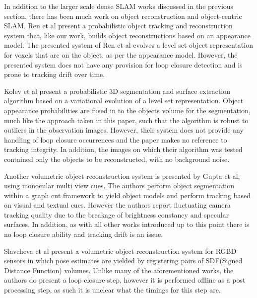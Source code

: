 In addition to the larger scale dense SLAM works discussed in the previous section, there has been much work on object reconstruction and 
object-centric SLAM. Ren et al present a probabilistic object tracking and reconstruction system\cite{Ren2013}  that, like our work, builds 
object reconstructions based on an appearance model. The presented system of Ren et al  evolves a level set object representation for voxels that 
are on the object, as per the appearance model. However, the presented system does not have any provision for loop closure detection and 
is prone to tracking drift over time.

Kolev et al present a probabilistic 3D segmentation and surface extraction algorithm\cite{Kolev2006} based on a variational evolution of a level 
set representation. Object appearance probabilities are fused in to the objects volume for the segmentation, much like the approach taken in 
this paper, such that the algorithm is robust to outliers in the observation images. However, their system does not provide any handling of 
loop closure occurrences and the paper makes no reference to tracking integrity. In addition, the images on which their algorithm was tested 
contained only the objects to be reconstructed, with no background noise.

Another volumetric object reconstruction system is presented by Gupta et al\cite{Gupta2016}, using monocular multi view cues. The authors 
perform object segmentation within a graph cut framework to yield object models and perform tracking based on visual and textual cues. 
However the authors report fluctuating camera tracking quality due to the breakage of brightness constancy and specular surfaces. In addition, 
as with all other works introduced up to this point there is no loop closure ability and tracking drift is an issue.

Slavcheva et al present a volumetric object reconstruction system for RGBD sensors in which pose estimates are yielded by registering pairs of 
SDF(Signed Distance Function) volumes. Unlike many of the aforementioned works, the authors do present a loop closure step, however it is 
performed offline as a post processing step, as such it is unclear what the timings for this step are. 


